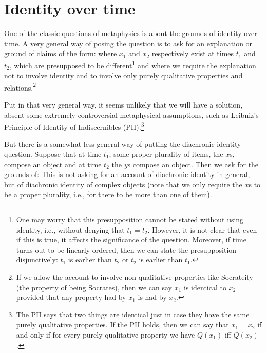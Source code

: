 \section{Identity over time}
One of the classic questions of metaphysics is about the grounds of identity over time. 
A very general way of posing the question is to ask for an explanation or ground of claims
of the form:
where $x_1$ and $x_2$ respectively exist at times $t_1$ and $t_2$, which are presupposed to be different\footnote{One may worry that this
presupposition cannot be stated without using identity, i.e., without denying that
$t_1=t_2$. However, it is not clear that even if this is true, it affects the
significance of the question. Moreover, if time turns out to be linearly ordered,
then we can state the presupposition disjunctively: $t_1$ is earlier than $t_2$ 
or $t_2$ is earlier than $t_1$.} and where we require the explanation not to
involve identity and to involve only purely qualitative properties and 
relations.\footnote{If we allow the account to involve non-qualitative properties 
like Socrateity (the property of being Socrates), then we can say $x_1$ is identical 
to $x_2$ provided that any property had by $x_1$ is had by $x_2$.}

Put in that very general way, it seems unlikely that we will have a solution, 
absent some extremely controversial metaphysical assumptions, such as 
Leibniz's Principle of Identity of Indiscernibles (PII).\footnote{The PII says
that two things are identical just in case they have the same purely qualitative
properties. If the PII holds, then we can say that $x_1=x_2$ if and only if 
for every purely qualitative property we have $Q(x_1)$ iff $Q(x_2)$.} 

But there is a somewhat less general way of putting the diachronic identity question.
Suppose that at time $t_1$, some proper plurality of items, the $x$s, compose an 
object and at time $t_2$ the $y$s compose an object. Then we ask for the grounds of:
This is not asking for an account of diachronic identity in general, but of diachronic
identity of complex objects (note that we only require the $x$s to be a proper
plurality, i.e., for there to be more than one of them).
    
